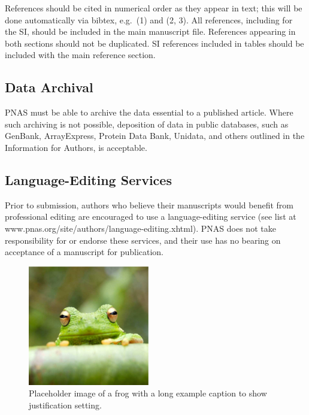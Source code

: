 \documentclass[9pt,twocolumn,twoside,]{pnas-new}
\begin{document}
References should be cited in numerical order as they appear in text;
this will be done automatically via bibtex, e.g.~(1) and (2, 3). All
references, including for the SI, should be included in the main
manuscript file. References appearing in both sections should not be
duplicated. SI references included in tables should be included with the
main reference section.

\hypertarget{data-archival}{%
\subsection*{Data Archival}\label{data-archival}}

PNAS must be able to archive the data essential to a published article.
Where such archiving is not possible, deposition of data in public
databases, such as GenBank, ArrayExpress, Protein Data Bank, Unidata,
and others outlined in the Information for Authors, is acceptable.

\hypertarget{language-editing-services}{%
\subsection*{Language-Editing
Services}\label{language-editing-services}}

Prior to submission, authors who believe their manuscripts would benefit
from professional editing are encouraged to use a language-editing
service (see list at www.pnas.org/site/authors/language-editing.xhtml).
PNAS does not take responsibility for or endorse these services, and
their use has no bearing on acceptance of a manuscript for publication.

\begin{figure}
\centering
\includegraphics{frog.png}
\caption{Placeholder image of a frog with a long example caption to show
justification setting.{}}
\end{figure}
\end{document}
